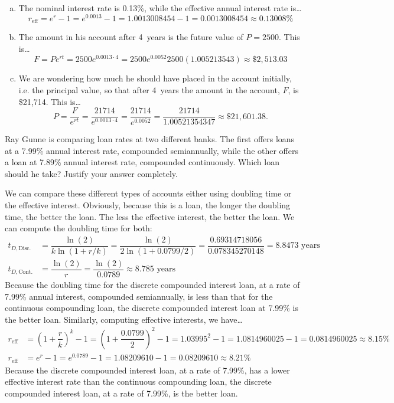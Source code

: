 \documentclass[11pt,letterpaper]{article}
\begin{document}
\begin{enumerate}[(a)]
\item The nominal interest rate is 0.13\%, while the effective annual interest rate is\dots
	\[
	r_{\text{eff}}= e^r - 1= e^{0.0013} - 1= 1.0013008454 - 1= 0.0013008454 \approx 0.13008\%
	\] \pspace

\item The amount in his account after 4~years is the future value of $P= 2500$. This is\dots
	\[
	F= Pe^{rt}= 2500 e^{0.0013 \cdot 4}= 2500 e^{0.0052} 2500(1.005213543) \approx \$2,513.03
	\] \pspace

\item We are wondering how much he should have placed in the account initially, i.e. the principal value, so that after 4~years the amount in the account, $F$, is \$21,714. This is\dots
	\[
	P= \dfrac{F}{e^{rt}}= \dfrac{21714}{e^{0.0013 \cdot 4}}= \dfrac{21714}{e^{0.0052}}= \dfrac{21714}{1.00521354347} \approx \$21,601.38.
	\] 
\end{enumerate}



\newpage



 Ray Gunne is comparing loan rates at two different banks. The first offers loans at a 7.99\% annual interest rate, compounded semiannually, while the other offers a loan at 7.89\% annual interest rate, compounded continuously. Which loan should he take? Justify your answer completely. \pspace

\sol We can compare these different types of accounts either using doubling time or the effective interest. Obviously, because this is a loan, the longer the doubling time, the better the loan. The less the effective interest, the better the loan. We can compute the doubling time for both: \pspace
	\[
	\begin{aligned}
	t_{D, \text{Disc.}}&= \dfrac{\ln(2)}{k \ln(1 + r/k)}= \dfrac{\ln(2)}{2 \ln(1 + 0.0799/2)}= \dfrac{0.69314718056}{0.078345270148}= 8.8473 \text{ years} \\[0.3cm]
	t_{D, \text{Cont.}}&= \dfrac{\ln(2)}{r}= \dfrac{\ln(2)}{0.0789} \approx 8.785 \text{ years}
	\end{aligned}
	\] \pspace
Because the doubling time for the discrete compounded interest loan, at a rate of 7.99\% annual interest, compounded semiannually, is less than that for the continuous compounding loan, the discrete compounded interest loan at 7.99\% is the better loan. Similarly, computing effective interests, we have\dots \pspace
	\[
	\begin{aligned}
	r_{\text{eff}}&= \left(1 + \dfrac{r}{k} \right)^k - 1= \left(1 + \dfrac{0.0799}{2} \right)^2 - 1= 1.03995^2 - 1= 1.0814960025 - 1= 0.0814960025 \approx 8.15\% \\[0.3cm]
	r_{\text{eff}}&= e^r - 1= e^{0.0789} - 1= 1.08209610 - 1= 0.08209610 \approx 8.21\%
	\end{aligned}
	\] \pspace
Because the discrete compounded interest loan, at a rate of 7.99\%, has a lower effective interest rate than the continuous compounding loan, the discrete compounded interest loan, at a rate of 7.99\%, is the better loan. 
\end{document}
